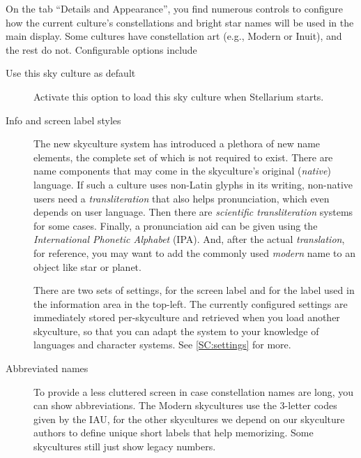 On the tab ``Details and Appearance'', you find numerous
controls to configure how the current culture's constellations and bright star names will be
used in the main display.  Some cultures have constellation art (e.g.,
Modern or Inuit), and the rest do not. Configurable options include
\begin{description}
\item[Use this sky culture as default] Activate this option to load
  this sky culture when Stellarium starts.
\item[Info and screen label styles] 


The new skyculture system has introduced a plethora of new name elements, 
the complete set of which is not required to exist. There are name components that may come 
in the skyculture's original (\emph{native}) language. If such a culture uses non-Latin glyphs in its writing, 
non-native users need a \emph{transliteration} that also helps pronunciation, which even depends on user language. 
Then there are \emph{scientific transliteration} systems for some cases. 
Finally, a pronunciation aid can be given using the \emph{International Phonetic Alphabet} (IPA).
And, after the actual \emph{translation}, for reference, you may want to add the commonly used \emph{modern} name to an object like star or planet. 

There are two sets of settings, for the screen label and for the label used in the information area in the top-left. 
The currently configured settings are immediately stored per-skyculture and retrieved when you load another skyculture, 
so that you can adapt the system to your knowledge of languages and character systems. See \ref{SC:settings} for more.

\item[Abbreviated names] To provide a less cluttered screen in case constellation names are long, you can show abbreviations. 
The Modern skycultures use the 3-letter codes given by the IAU, for the other skycultures we depend on our skyculture authors 
to define unique short labels that help memorizing. Some skycultures still just show legacy numbers.
 

\end{description}
